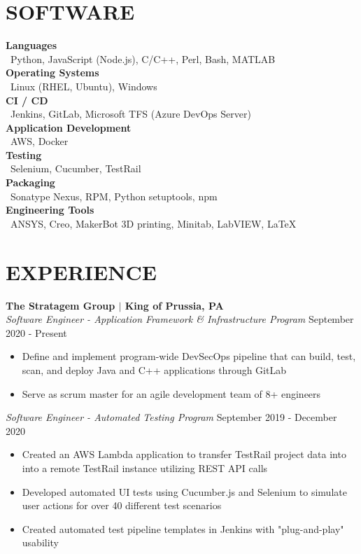 \documentclass[line,resmargin,11pt]{res}
\begin{document}
\begin{resume}
\section{SOFTWARE}
\textbf{Languages} \\
\textbullet\ Python, JavaScript (Node.js), C/C++, Perl, Bash, MATLAB  \\
\textbf{Operating Systems} \\
\textbullet\ Linux (RHEL, Ubuntu), Windows \\
\textbf{CI / CD} \\
\textbullet\ Jenkins, GitLab, Microsoft TFS (Azure DevOps Server) \\
\textbf{Application Development} \\
\textbullet\ AWS, Docker \\
\textbf{Testing} \\
\textbullet\ Selenium, Cucumber, TestRail \\
\textbf{Packaging} \\
\textbullet\ Sonatype Nexus, RPM, Python setuptools, npm \\
\textbf{Engineering Tools} \\
\textbullet\ ANSYS, Creo, MakerBot 3D printing, Minitab, LabVIEW, \LaTeX        
 
\section{EXPERIENCE}
\textbf{The Stratagem Group $|$ King of Prussia, PA} \\
{\sl Software Engineer - Application Framework \& Infrastructure Program} \hfill September 2020 - Present
	\begin{itemize} \itemsep -2pt %
		\item Define and implement program-wide DevSecOps pipeline that can build, test, scan, and deploy Java and C++ applications through GitLab
		\item Serve as scrum master for an agile development team of 8+ engineers
	\end{itemize}

{\sl Software Engineer - Automated Testing Program} \hfill September 2019 - December 2020
	\begin{itemize} \itemsep -2pt %
		\item Created an AWS Lambda application to transfer TestRail project data into into a remote TestRail instance utilizing REST API calls
		\item Developed automated UI tests using Cucumber.js and Selenium to simulate user actions for over 40 different test scenarios
		\item Created automated test pipeline templates in Jenkins with "plug-and-play" usability
	\end{itemize}
	

\end{resume}
\end{document}
